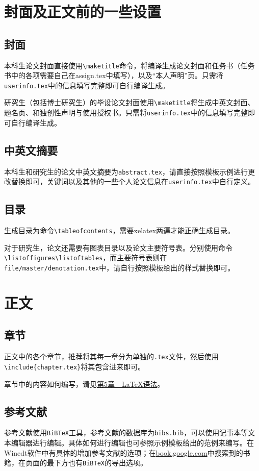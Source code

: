 \section{封面及正文前的一些设置}
\subsection{封面}
本科生论文封面直接使用\texttt{\textbackslash maketitle}命令，将编译生成论文封面和任务书（任务书中的各项需要自己在assign.tex中填写），以及“本人声明”页。只需将\texttt{userinfo.tex}中的信息填写完整即可自行编译生成。

研究生（包括博士研究生）的毕设论文封面使用\texttt{\textbackslash maketitle}将生成中英文封面、题名页、和独创性声明与使用授权书。只需将\texttt{userinfo.tex}中的信息填写完整即可自行编译生成。

\subsection{中英文摘要}
本科生和研究生的论文中英文摘要为\texttt{abstract.tex}，请直接按照模板示例进行更改替换即可，关键词以及其他的一些个人论文信息在\texttt{userinfo.tex}中自行定义。
\subsection{目录}
生成目录为命令\texttt{\textbackslash tableofcontents}，需要xelatex两遍才能正确生成目录。

对于研究生，论文还需要有图表目录以及论文主要符号表。分别使用命令\texttt{\textbackslash listoffigures}\texttt{\textbackslash listoftables}，而主要符号表则在\texttt{file/master/denotation.tex}中，请自行按照模板给出的样式替换即可。

\section{正文}
\subsection{章节}
正文中的各个章节，推荐将其每一章分为单独的\texttt{.tex}文件，然后使用\texttt{\textbackslash include\{chapter.tex\}}将其包含进来即可。

章节中的内容如何编写，请见\hyperref[chapter-basic]{第5章~~\LaTeX{}语法}。

\subsection{参考文献}
参考文献使用\texttt{BiBTeX}工具，参考文献的数据库为\texttt{bibs.bib}，可以使用记事本等文本编辑器进行编辑。具体如何进行编辑也可参照示例模板给出的范例来编写。在Winedt软件中有具体的增加参考文献的选项；在\url{book.google.com}中搜索到的书籍，在页面的最下方也有\texttt{BiBTeX}的导出选项。

